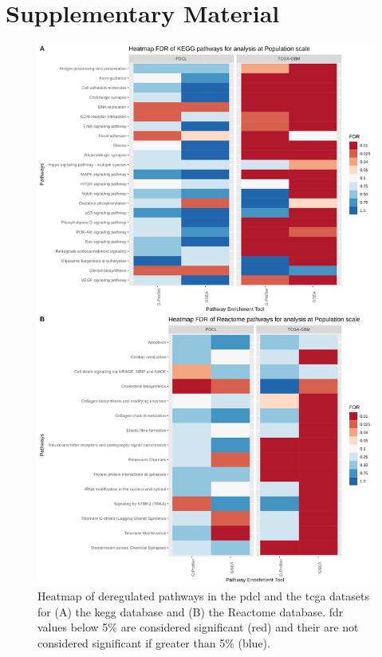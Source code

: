 \section{Supplementary Material}

\begin{figure}
    \begin{center}
        \includegraphics[height=0.7\paperheight]{img/heatmap-fdr-global}
        \caption{
            Heatmap of deregulated pathways in the \acrshort{pdcl} and the \acrshort{tcga} datasets for (A) the \acrshort{kegg} database and (B) the Reactome database.
            \acrshort{fdr} values below 5\% are considered significant (red) and their are not considered significant if greater than 5\% (blue).
        }
        \label{supp:heatmap-fdr-global}
    \end{center}
\end{figure}


